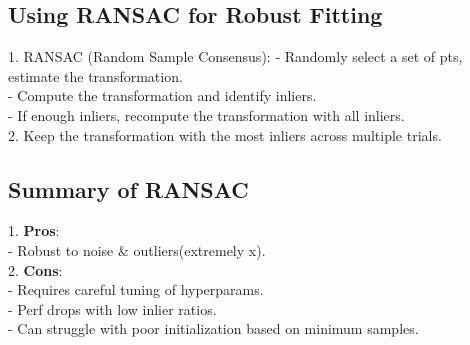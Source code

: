 \subsection*{Using RANSAC for Robust Fitting}
1. RANSAC (Random Sample Consensus):
   - Randomly select a set of pts, estimate the transformation. \\
   - Compute the transformation and identify inliers. \\
   - If enough inliers, recompute the transformation with all inliers. \\
2. Keep the transformation with the most inliers across multiple trials.

\subsection*{Summary of RANSAC}
1. \textbf{Pros}: \\
   - Robust to noise \& outliers(extremely x). \\
2. \textbf{Cons}: \\
   - Requires careful tuning of hyperparams. \\
   - Perf drops with low inlier ratios. \\
   - Can struggle with poor initialization based on minimum samples.
